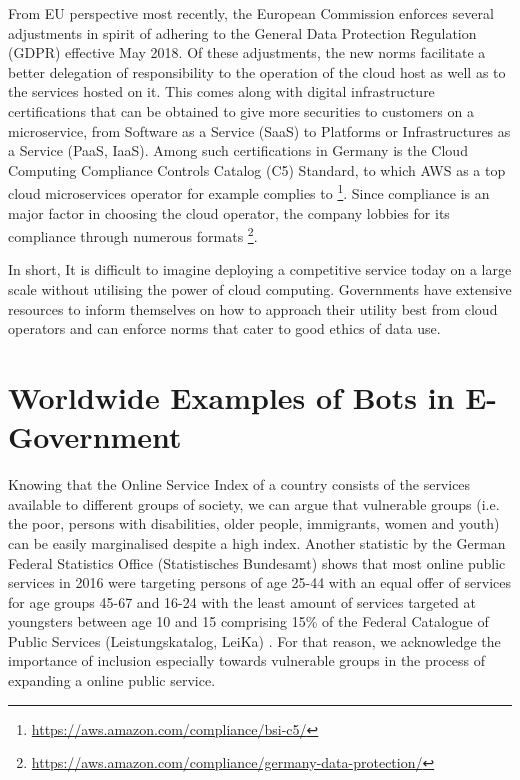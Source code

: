 From EU perspective most recently, the European Commission enforces several adjustments in spirit of adhering to the General Data Protection Regulation (GDPR) effective May 2018. Of these adjustments, the new norms facilitate a better delegation of responsibility to the operation of the cloud host as well as to the services hosted on it.
This comes along with digital infrastructure certifications that can be obtained to give more securities to customers on a microservice, %
from Software as a Service (SaaS) to Platforms or Infrastructures as a Service (PaaS, IaaS). %
Among such certifications in Germany is the Cloud Computing Compliance Controls Catalog (C5) Standard, to which AWS as a top cloud microservices operator for example complies to \footnote{\url{https://aws.amazon.com/compliance/bsi-c5/}}. Since compliance is an major factor in choosing the cloud operator, the company lobbies for its compliance through numerous formats \footnote{\url{https://aws.amazon.com/compliance/germany-data-protection/}}.

In short, It is difficult to imagine deploying a competitive service today on a large scale without utilising the power of cloud computing. Governments have extensive resources to inform themselves on how to approach their utility best from cloud operators and can enforce norms that cater to good ethics of data use.


\section{Worldwide Examples of Bots in E-Government}

Knowing that the Online Service Index of a country consists of the services available to different groups of society, we can argue that 
vulnerable groups (i.e. the poor, persons with disabilities, older people, immigrants, women and youth) can be easily marginalised despite a high index. Another statistic by the German Federal Statistics Office (Statistisches Bundesamt) shows that most online public services in 2016 were targeting persons of age 25-44 with an equal offer of services for age groups 45-67 and 16-24 with the least amount of services targeted at youngsters between age 10 and 15 comprising 15\% of the Federal Catalogue of Public Services  (Leistungskatalog, LeiKa) \cite{stabunda:leika}.
For that reason, we acknowledge the importance of inclusion especially towards vulnerable groups in the process of expanding a online public service.

